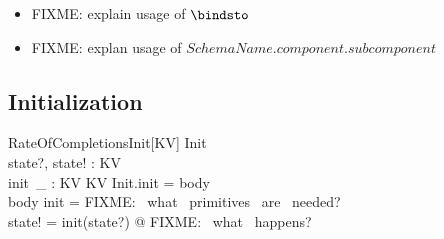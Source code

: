 \documentclass[../main.tex]{subfiles}
\begin{document}
\begin{itemize}
\item FIXME: explain usage of $\bindsto$
\item FIXME: explan usage of $SchemaName.component.subcomponent$
\end{itemize}

\subsection{Initialization}
\begin{schema}{RateOfCompletionsInit[KV]}
  Init \\
  state?, state! : KV \\
  init~\_ : KV \surj KV
  \where
  Init.init = \langle body \rangle \\
  \langle body \rangle \bindsto init = \langle FIXME: ~what ~primitives ~are ~needed? \rangle \\
  state! = init(state?) @ FIXME: ~what ~happens?
\end{schema}
\end{document}
